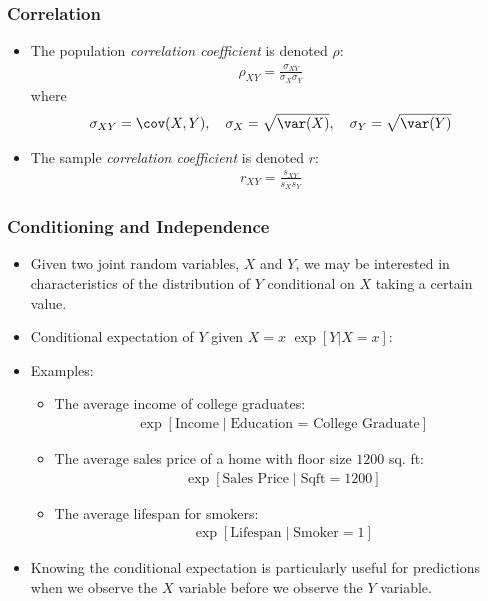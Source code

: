 \begin{frame}
\frametitle{Correlation} 
\begin{itemize}
\item The population \emph{correlation coefficient} is denoted $\rho$:
\begin{align*}
\rho_{XY} = \frac{\sigma_{XY}}{\sigma_X\sigma_Y} 
\end{align*} 
where
\begin{align*}
\sigma_{XY} = \cov(X,Y), \quad
   \sigma_X = \sqrt{\var(X)}, \quad
   \sigma_Y = \sqrt{\var(Y)}
\end{align*}
\item The sample \emph{correlation coefficient} is denoted $r$:
\begin{align*}
r_{XY} = \frac{s_{XY}}{s_X s_Y} 
\end{align*} 
\end{itemize}
\end{frame}


\begin{frame}
\frametitle{Conditioning and Independence} 
\begin{itemize}
\item Given two joint random variables, $X$ and $Y$, we may be interested in characteristics of the distribution of $Y$ conditional on $X$ taking a certain value. 
\item Conditional expectation of $Y$ given $X=x$ $\exp[Y|X=x]$:
\item Examples:
\begin{itemize}
\item The average income of college graduates: 
\begin{align*}
\exp[\text{Income} \mid \text{Education = College Graduate}]
\end{align*}
\item The average sales price of a home with floor size $1200$ sq. ft: 
\begin{align*}
\exp[\text{Sales Price}\mid\text{Sqft} = 1200]
\end{align*}
\item The average lifespan for smokers: 
\begin{align*}
\exp[\text{Lifespan}\mid\text{Smoker}=1]
\end{align*}\vspace{-4ex}
\end{itemize}
\item Knowing the conditional expectation is particularly useful for predictions when we observe the $X$ variable before we observe the $Y$ variable.
\end{itemize}
\end{frame}


